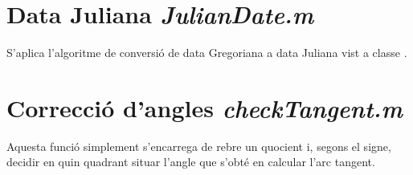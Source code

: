 \section[Data Juliana]{Data Juliana \textit{JulianDate.m}}
S'aplica l'algoritme de conversió de data Gregoriana a data Juliana vist a classe \cite[pàg.48]{Calaf2017a}.

\section[Correcció d'angles]{Correcció d'angles \textit{checkTangent.m}}
Aquesta funció simplement s'encarrega de rebre un quocient i, segons el signe, decidir en quin quadrant situar l'angle que s'obté en calcular l'arc tangent.

